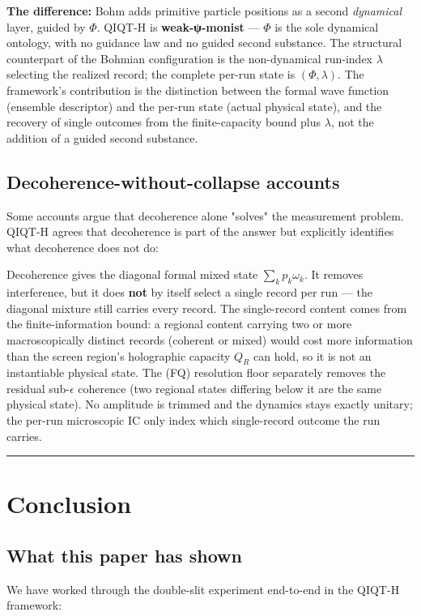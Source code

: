\documentclass[11pt,a4paper]{article}
\begin{document}
\textbf{The difference:} Bohm adds primitive particle positions as a second \emph{dynamical} layer, guided by $\Phi$. QIQT-H is \textbf{weak-ψ-monist} — $\Phi$ is the sole dynamical ontology, with no guidance law and no guided second substance. The structural counterpart of the Bohmian configuration is the non-dynamical run-index $\lambda$ selecting the realized record; the complete per-run state is $(\Phi, \lambda)$. The framework's contribution is the distinction between the formal wave function (ensemble descriptor) and the per-run state (actual physical state), and the recovery of single outcomes from the finite-capacity bound plus $\lambda$, not the addition of a guided second substance.

\subsection{Decoherence-without-collapse accounts}

Some accounts argue that decoherence alone "solves" the measurement problem. QIQT-H agrees that decoherence is part of the answer but explicitly identifies what decoherence does not do:

Decoherence gives the diagonal formal mixed state $\sum_k p_k \omega_k$. It removes interference, but it does \textbf{not} by itself select a single record per run — the diagonal mixture still carries every record. The single-record content comes from the finite-information bound: a regional content carrying two or more macroscopically distinct records (coherent or mixed) would cost more information than the screen region's holographic capacity $Q_R$ can hold, so it is not an instantiable physical state. The (FQ) resolution floor separately removes the residual sub-$\epsilon$ coherence (two regional states differing below it are the same physical state). No amplitude is trimmed and the dynamics stays exactly unitary; the per-run microscopic IC only index which single-record outcome the run carries.

\medskip\hrule\medskip

\section{Conclusion}

\subsection{What this paper has shown}

We have worked through the double-slit experiment end-to-end in the QIQT-H framework:
\end{document}
